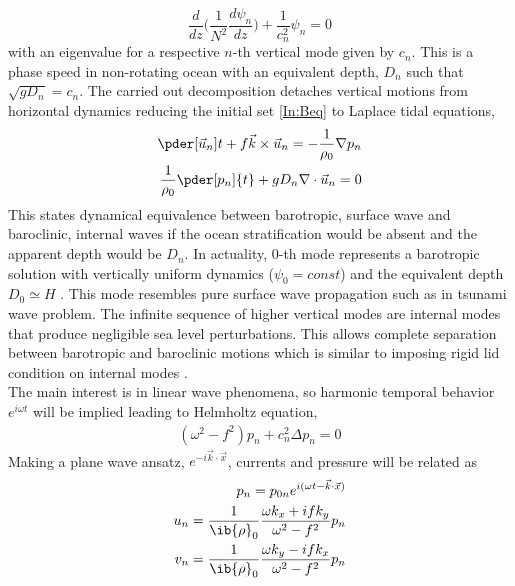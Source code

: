 \documentclass[12pt]{article}
\begin{document}
\begin{equation}
\frac{d}{dz}\big( \frac{1}{N^2} \frac{d \psi_n}{dz} \big) + \frac{1}{c^2_n}\psi_n = 0
\end{equation}
with an eigenvalue for a respective $n$-th vertical mode given by $c_n$. This is a phase speed in 
non-rotating ocean with an equivalent depth, $D_n$ such that $\sqrt{g D_n} = c_n$. The carried out 
decomposition detaches vertical motions from horizontal dynamics reducing the initial set 
\eqref{In:Beq} to Laplace tidal equations,
\begin{subequations}
\label{In:sweq}
\begin{align}
\pder[\vec{u}_n]{t} + f \vec{k} \times \vec{u}_n = -\frac{1}{\rho_0} \nabla p_n \label{In:swe.mom}\\
\frac{1}{\rho_0} \pder[p_n]{t} + g D_n \nabla  \cdot \vec{u}_n = 0 \label{In:swe.cont}
\end{align}
\end{subequations}
This states dynamical equivalence between barotropic, surface  wave and baroclinic, internal waves 
if the ocean stratification would be absent and the apparent depth would be $D_n$. In actuality, 
$0$-th mode represents a barotropic solution with vertically uniform dynamics ($\psi_0 = const$) 
and the equivalent depth $D_0 \simeq H$ \citep{hendershott1981long}. This mode resembles pure 
surface wave propagation such as in tsunami wave problem. The infinite sequence of higher vertical 
modes are internal modes that produce negligible sea level perturbations. This allows complete 
separation between barotropic and baroclinic motions which is similar to imposing rigid lid 
condition on internal modes \citep{kundu2008fluid}.\\
The main interest is in linear wave phenomena, so harmonic temporal behavior $e^{i \omega t}$ will be implied leading to Helmholtz equation,
\begin{align}
\label{In:helmeq}
(\omega^2 - f^2) p_n + c_n^2 \Delta p_n = 0
\end{align}
Making a plane wave ansatz, $e^{-i\vec{k} \cdot \vec{x}}$, currents and pressure will be related as
\begin{align}
\begin{split}
p_n = p_{0n} e^{i (\omega t - \vec{k} \cdot \vec{x})}\\
u_n = \frac{1}{\ib{\rho}_0} \frac{\omega k_x + i f k_y}{\omega^2 - f^2} p_n\\
v_n = \frac{1}{\ib{\rho}_0} \frac{\omega k_y - i f k_x}{\omega^2 - f^2} p_n
\end{split}
\end{align}
\end{document}
